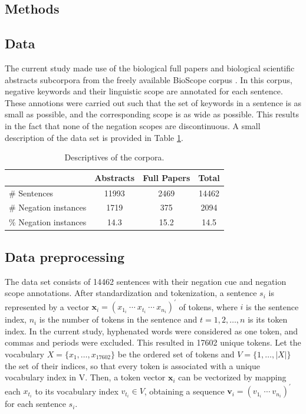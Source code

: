 \documentclass{article}
\begin{document}
\begin{multicols}{2}
\section{Methods}

\subsection{Data}
The current study made use of the biological full papers and biological scientific abstracts subcorpora from the freely available BioScope corpus \citep{bioscope}. In this corpus, negative keywords and their linguistic scope are annotated for each sentence. These annotions were carried out such that the set of keywords in a sentence is as small as possible, and the corresponding scope is as wide as possible. This results in the fact that none of the negation scopes are discontinuous. A small description of the data set is provided in Table \ref{datadescription}. 

\begin{table}[t]
	\centering
	\caption{Descriptives of the corpora.}
	\label{datadescription}
	\begin{tabular}{l | c c | c}
	\hline
	 & Abstracts & Full Papers & Total \\
	\hline \hline
	\# Sentences & 11993 & 2469 & 14462\\
	\# Negation instances & 1719 & 375 & 2094 \\
	\% Negation instances & 14.3 & 15.2 & 14.5 \\
	\hline
	\end{tabular}
\end{table}

\subsection{Data preprocessing}
The data set consists of 14462 sentences with their negation cue and negation scope annotations. After standardization and tokenization, a sentence $s_i$ is represented by a vector $\mathbf{x}_i = (x_{1_i}~\cdots~x_{t_i}~\cdots~x_{n_i})^{\prime}$ of tokens, where $i$ is the sentence index, $n_i$ is the number of tokens in the sentence and $t = 1,2, \dots, n$ is its token index. In the current study, hyphenated words were considered as one token, and commas and periods were excluded. This resulted in 17602 unique tokens. Let the vocabulary $X = \{x_1,\dots, x_{17602}\}$ be the ordered set of tokens and $V=\{1,\dots,|X|\}$ the set of their indices, so that every token is associated with a unique vocabulary index in V. Then, a token vector $\mathbf{x}_i$ can be vectorized by mapping each $x_{t_i}$ to its vocabulary index $v_{t_i} \in V$, obtaining a sequence $\mathbf{v}_i = (v_{1_i}~\cdots~v_{n_i})^{\prime}$ for each sentence $s_i$.


\end{multicols}
\end{document}
